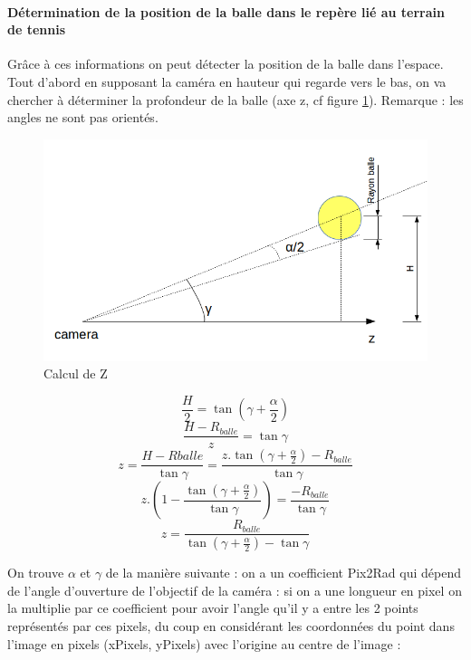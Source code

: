 \paragraph{Détermination de la position de la balle dans le repère lié au terrain de tennis\\}

Grâce à ces informations on peut détecter la position de la balle dans l'espace. Tout d'abord en supposant la caméra en hauteur qui regarde vers le bas, on va chercher à déterminer la profondeur de la balle (axe z, cf figure \ref{img_calculz}). Remarque : les angles ne sont pas orientés.\\

\begin{figure}[h]
\begin{center}
\includegraphics[width=\textwidth]{dessin_calcul_z.png}
\caption{Calcul de Z}
\label{img_calculz}
\end{center}
\end{figure}


$$ \frac{H}{2} = \tan ( \gamma + \frac{\alpha}{2} ) $$
$$ \frac{H - R_{balle}}{z} = \tan \gamma  $$
$$ z = \frac{H - R{balle}}{\tan \gamma} = \frac{z.\tan (\gamma + \frac{\alpha}{2}) - R_{balle}} {\tan \gamma}  $$
$$ z.(1 - \frac{\tan (\gamma + \frac{\alpha}{2})}{\tan \gamma}) = \frac{-R_{balle}}{\tan \gamma} $$
$$ z = \frac{R_{balle}}{\tan (\gamma + \frac{\alpha}{2}) - \tan \gamma}
$$

On trouve $\alpha$ et $\gamma$ de la manière suivante : on a un coefficient Pix2Rad qui dépend de l'angle d'ouverture de l'objectif de la caméra : si on a une longueur en pixel on la multiplie par ce coefficient pour avoir l'angle qu'il y a entre les 2 points représentés par ces pixels, du coup en considérant les coordonnées du point dans l'image en pixels (xPixels, yPixels) avec l'origine au centre de l'image :

